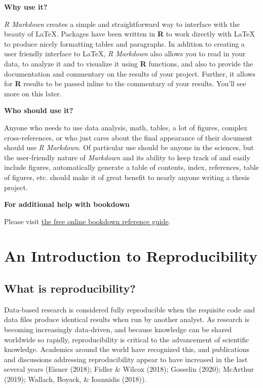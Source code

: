\documentclass[12pt,twoside]{reedthesis}
\begin{document}
\textbf{Why use it?}

\emph{R Markdown} creates a simple and straightforward way to interface
with the beauty of LaTeX. Packages have been written in \textbf{R} to
work directly with LaTeX to produce nicely formatting tables and
paragraphs. In addition to creating a user friendly interface to LaTeX,
\emph{R Markdown} also allows you to read in your data, to analyze it
and to visualize it using \textbf{R} functions, and also to provide the
documentation and commentary on the results of your project. Further, it
allows for \textbf{R} results to be passed inline to the commentary of
your results. You'll see more on this later.

\textbf{Who should use it?}

Anyone who needs to use data analysis, math, tables, a lot of figures,
complex cross-references, or who just cares about the final appearance
of their document should use \emph{R Markdown}. Of particular use should
be anyone in the sciences, but the user-friendly nature of
\emph{Markdown} and its ability to keep track of and easily include
figures, automatically generate a table of contents, index, references,
table of figures, etc. should make it of great benefit to nearly anyone
writing a thesis project.

\textbf{For additional help with bookdown}

Please visit \href{https://bookdown.org/yihui/bookdown/}{the free online
bookdown reference guide}.

\chapter{An Introduction to Reproducibility}\label{reproducibility}

\section{What is reproducibility?}\label{what-is-reproducibility}

Data-based research is considered fully reproducible when the requisite
code and data files produce identical results when run by another
analyst. As research is becoming increasingly data-driven, and because
knowledge can be shared worldwide so rapidly, reproducibility is
critical to the advancement of scientific knowledge. Academics around
the world have recognized this, and publications and discussions
addressing reproducibility appear to have increased in the last several
years (Eisner (2018); Fidler \& Wilcox (2018); Gosselin (2020); McArthur
(2019); Wallach, Boyack, \& Ioannidis (2018)).
\end{document}
